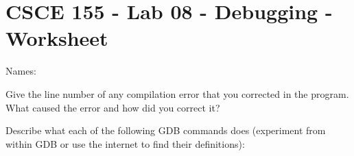 \documentclass[10pt]{exam}
\begin{document}
\section*{CSCE 155 - Lab 08 - Debugging - Worksheet}

Names: \underline{\hspace{10cm}}

\begin{questions}

\question Give the line number of any compilation error that you 
corrected in the program. What caused the error and how did you 
correct it?

\begin{solution}[2cm]
\end{solution}


\question Describe what each of the following GDB commands does 
(experiment from within GDB or use the internet to find their 
definitions):
\end{questions}
\end{document}
